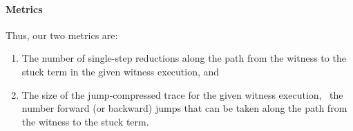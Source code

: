 \paragraph{Metrics} Thus, our two metrics are:
%
\begin{enumerate}
\item {}
      The number of single-step reductions along the path from the
      witness to the stuck term in the given witness execution, and
\item {}
      The size of the jump-compressed trace for the given witness execution,
      \ie\ the number forward (or backward) jumps that can be taken along the
      path from the witness to the stuck term.
\end{enumerate}


